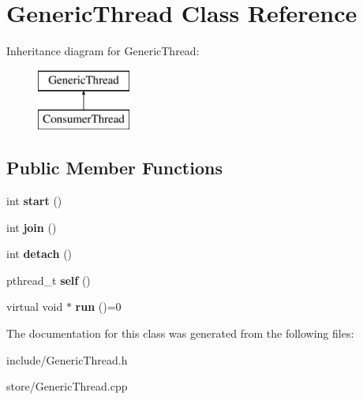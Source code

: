 \hypertarget{classGenericThread}{\section{Generic\-Thread Class Reference}
\label{classGenericThread}
}
Inheritance diagram for Generic\-Thread\-:\begin{figure}[H]
\begin{center}
\leavevmode
\includegraphics[height=2.000000cm]{classGenericThread}
\end{center}
\end{figure}
\subsection*{Public Member Functions}
\begin{DoxyCompactItemize}
\item 
\hypertarget{classGenericThread_ac1d8c3d7dcaae01e89c69093a065141f}{int {\bfseries start} ()}\label{classGenericThread_ac1d8c3d7dcaae01e89c69093a065141f}

\item 
\hypertarget{classGenericThread_a217ef41077ae00ce48372c03838af96a}{int {\bfseries join} ()}\label{classGenericThread_a217ef41077ae00ce48372c03838af96a}

\item 
\hypertarget{classGenericThread_abd0849015ec4004b789aa3181853fbf6}{int {\bfseries detach} ()}\label{classGenericThread_abd0849015ec4004b789aa3181853fbf6}

\item 
\hypertarget{classGenericThread_a0ac1c8aa0c6f5d47d73626c13854d444}{pthread\-\_\-t {\bfseries self} ()}\label{classGenericThread_a0ac1c8aa0c6f5d47d73626c13854d444}

\item 
\hypertarget{classGenericThread_a54147ff9f16e7985e634b5f0d6d5b7f9}{virtual void $\ast$ {\bfseries run} ()=0}\label{classGenericThread_a54147ff9f16e7985e634b5f0d6d5b7f9}

\end{DoxyCompactItemize}


The documentation for this class was generated from the following files\-:\begin{DoxyCompactItemize}
\item 
include/Generic\-Thread.\-h\item 
store/Generic\-Thread.\-cpp\end{DoxyCompactItemize}
